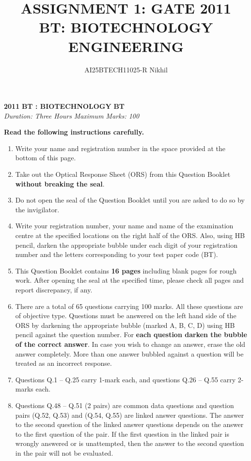 \documentclass[journal,12pt,onecolumn]{IEEEtran}
\begin{document}
\title{
ASSIGNMENT 1: GATE 2011 \\
BT: BIOTECHNOLOGY ENGINEERING}
\author{AI25BTECH11025-R Nikhil}
\maketitle
\renewcommand{\thefigure}{\theenumi}
\renewcommand{\thetable}{\theenumi}

\begin{center}
    \textbf{2011} \hfill \textbf{BT : BIOTECHNOLOGY} \hfill \textbf{BT} \\[6pt]
    \textit{Duration: Three Hours} \hfill \textit{Maximum Marks: 100}
\end{center}


\noindent \textbf{Read the following instructions carefully.}
\begin{enumerate}
    \item Write your name and registration number in the space provided at the bottom of this page.
    \item Take out the Optical Response Sheet (ORS) from this Question Booklet \textbf{without breaking the seal}.
    \item Do not open the seal of the Question Booklet until you are asked to do so by the invigilator.
    \item Write your registration number, your name and name of the examination centre at the specified locations on the right half of the ORS. Also, using HB pencil, darken the appropriate bubble under each digit of your registration number and the letters corresponding to your test paper code (BT).
    \item This Question Booklet contains \textbf{16 pages} including blank pages for rough work. After opening the seal at the specified time, please check all pages and report discrepancy, if any.
    \item There are a total of 65 questions carrying 100 marks. All these questions are of objective type. Questions must be answered on the left hand side of the ORS by darkening the appropriate bubble (marked A, B, C, D) using HB pencil against the question number. For \textbf{each question darken the bubble of the correct answer}. In case you wish to change an answer, erase the old answer completely. More than one answer bubbled against a question will be treated as an incorrect response.
    \item Questions Q.1 – Q.25 carry 1-mark each, and questions Q.26 – Q.55 carry 2-marks each.
    \item Questions Q.48 – Q.51 (2 pairs) are common data questions and question pairs (Q.52, Q.53) and (Q.54, Q.55) are linked answer questions. The answer to the second question of the linked answer questions depends on the answer to the first question of the pair. If the first question in the linked pair is wrongly answered or is unattempted, then the answer to the second question in the pair will not be evaluated.

\end{enumerate}
\end{document}
